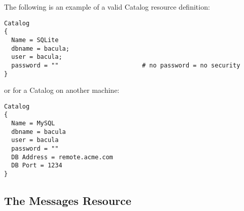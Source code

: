 \begin{description}


\end{description}

The following is an example of a valid Catalog resource definition: 

\footnotesize
\begin{verbatim}
Catalog
{
  Name = SQLite
  dbname = bacula;
  user = bacula;
  password = ""                       # no password = no security
}
\end{verbatim}
\normalsize

or for a Catalog on another machine: 

\footnotesize
\begin{verbatim}
Catalog
{
  Name = MySQL
  dbname = bacula
  user = bacula
  password = ""
  DB Address = remote.acme.com
  DB Port = 1234
}
\end{verbatim}
\normalsize

\subsection*{The Messages Resource}
\label{MessagesResource2}

